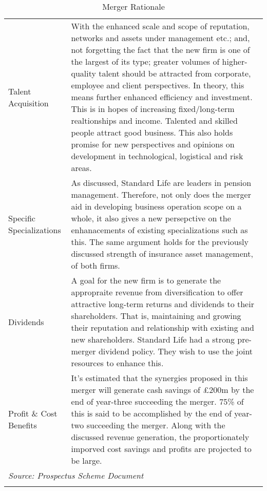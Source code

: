 \documentclass[11pt, english]{article}
\begin{document}
\begin{center}
\begin{longtable}{p{4cm}p{8.5cm}}
        Talent Acquisition & With the enhanced scale and scope of reputation, networks and assets under management etc.; and, not forgetting the fact that the new firm is one of the largest of its type; greater volumes of higher-quality talent should be attracted from corporate, employee and client perspectives. In theory, this means further enhanced efficiency and investment. This is in hopes of increasing fixed/long-term realtionships and income. Talented and skilled people attract good business. This also holds promise for new perspectives and opinions on development in technological, logistical and risk areas.\\
	Specific Specializations & As discussed, Standard Life are leaders in pension management. Therefore, not only does the merger aid in developing business operation scope on a whole, it also gives a new persepctive on the enhanacements of existing specializations such as this. The same argument holds for the previously discussed strength of insurance asset management, of both firms.\\
        Dividends & A goal for the new firm is to generate the appropraite revenue from diversification to offer attractive long-term returns and dividends to their shareholders. That is, maintaining and growing their reputation and relationship with existing and new shareholders. Standard Life had a strong pre-merger dividend policy. They wish to use the joint resources to enhance this.\\
        Profit \& Cost Benefits & It's estimated that the synergies proposed in this merger will generate cash savings of $\pounds$200m by the end of year-three succeeding the merger. 75\% of this is said to be accomplished by the end of year-two succeeding the merger. Along with the discussed revenue generation, the proportionately imporved cost savings and profits are projected to be large.\\ 
        \hline
        \multicolumn{2}{l}{\textit{Source: Prospectus Scheme Document}}\\
        \hline
        \caption{Merger Rationale}
\end{longtable}
\end{center}

\newpage
\end{document}
